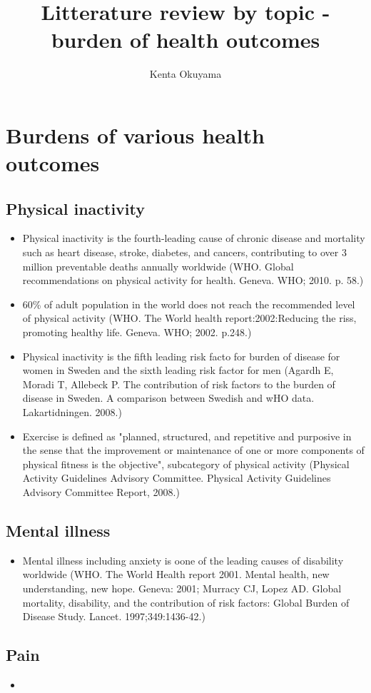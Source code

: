 \documentclass{article}
\title{Litterature review by topic - burden of health outcomes}
\author{Kenta Okuyama}
\begin{document}
\maketitle
\tableofcontents
\newpage
{}


\section{Burdens of various health outcomes}
\subsection{Physical inactivity}
\begin{itemize}
	\item Physical inactivity is the fourth-leading cause of chronic disease and mortality such as heart disease, stroke, diabetes, and cancers, contributing to over 3 million preventable deaths annually worldwide (WHO. Global recommendations on physical activity for health. Geneva. WHO; 2010. p. 58.)
	\item 60\% of adult population in the world does not reach the recommended level of physical activity (WHO. The World health report:2002:Reducing the riss, promoting healthy life. Geneva. WHO; 2002. p.248.)
	\item Physical inactivity is the fifth leading risk facto for burden of disease for women in Sweden and the sixth leading risk factor for men (Agardh E, Moradi T, Allebeck P. The contribution of risk factors to the burden of disease in Sweden. A comparison between Swedish and wHO data. Lakartidningen. 2008.)
	\item Exercise is defined as "planned, structured, and repetitive and purposive in the sense that the improvement or maintenance of one or more components of physical fitness is the objective", subcategory of physical activity (Physical Activity Guidelines Advisory Committee. Physical Activity Guidelines Advisory Committee Report, 2008.)
\end{itemize}

\subsection{Mental illness}
\begin{itemize}
	\item Mental illness including anxiety is oone of the leading causes of disability worldwide (WHO. The World Health report 2001. Mental health, new understanding, new hope. Geneva: 2001; Murracy CJ, Lopez AD. Global mortality, disability, and the contribution of risk factors: Global Burden of Disease Study. Lancet. 1997;349:1436-42.)
\end{itemize}

\subsection{Pain}
\begin{itemize}
	\item 
\end{itemize}
\end{document}
